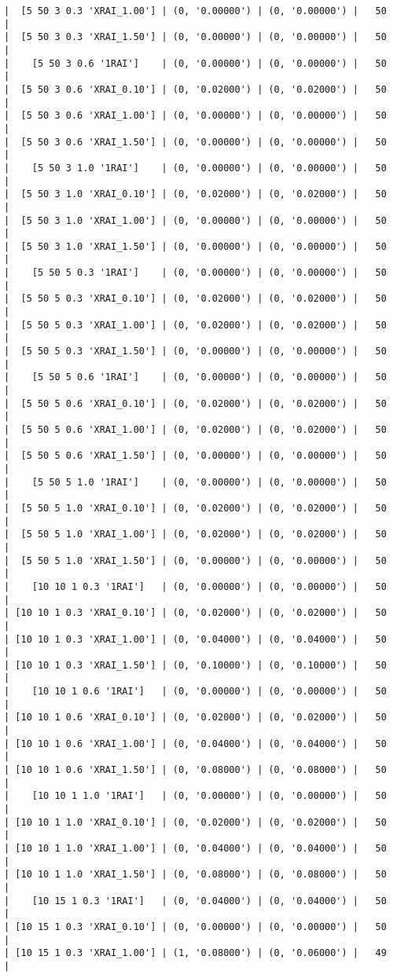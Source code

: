 \documentclass{article}
\begin{document}
\begin{verbatim}
|  [5 50 3 0.3 'XRAI_1.00'] | (0, '0.00000') | (0, '0.00000') |   50  |
|  [5 50 3 0.3 'XRAI_1.50'] | (0, '0.00000') | (0, '0.00000') |   50  |
|    [5 50 3 0.6 '1RAI']    | (0, '0.00000') | (0, '0.00000') |   50  |
|  [5 50 3 0.6 'XRAI_0.10'] | (0, '0.02000') | (0, '0.02000') |   50  |
|  [5 50 3 0.6 'XRAI_1.00'] | (0, '0.00000') | (0, '0.00000') |   50  |
|  [5 50 3 0.6 'XRAI_1.50'] | (0, '0.00000') | (0, '0.00000') |   50  |
|    [5 50 3 1.0 '1RAI']    | (0, '0.00000') | (0, '0.00000') |   50  |
|  [5 50 3 1.0 'XRAI_0.10'] | (0, '0.02000') | (0, '0.02000') |   50  |
|  [5 50 3 1.0 'XRAI_1.00'] | (0, '0.00000') | (0, '0.00000') |   50  |
|  [5 50 3 1.0 'XRAI_1.50'] | (0, '0.00000') | (0, '0.00000') |   50  |
|    [5 50 5 0.3 '1RAI']    | (0, '0.00000') | (0, '0.00000') |   50  |
|  [5 50 5 0.3 'XRAI_0.10'] | (0, '0.02000') | (0, '0.02000') |   50  |
|  [5 50 5 0.3 'XRAI_1.00'] | (0, '0.02000') | (0, '0.02000') |   50  |
|  [5 50 5 0.3 'XRAI_1.50'] | (0, '0.00000') | (0, '0.00000') |   50  |
|    [5 50 5 0.6 '1RAI']    | (0, '0.00000') | (0, '0.00000') |   50  |
|  [5 50 5 0.6 'XRAI_0.10'] | (0, '0.02000') | (0, '0.02000') |   50  |
|  [5 50 5 0.6 'XRAI_1.00'] | (0, '0.02000') | (0, '0.02000') |   50  |
|  [5 50 5 0.6 'XRAI_1.50'] | (0, '0.00000') | (0, '0.00000') |   50  |
|    [5 50 5 1.0 '1RAI']    | (0, '0.00000') | (0, '0.00000') |   50  |
|  [5 50 5 1.0 'XRAI_0.10'] | (0, '0.02000') | (0, '0.02000') |   50  |
|  [5 50 5 1.0 'XRAI_1.00'] | (0, '0.02000') | (0, '0.02000') |   50  |
|  [5 50 5 1.0 'XRAI_1.50'] | (0, '0.00000') | (0, '0.00000') |   50  |
|    [10 10 1 0.3 '1RAI']   | (0, '0.00000') | (0, '0.00000') |   50  |
| [10 10 1 0.3 'XRAI_0.10'] | (0, '0.02000') | (0, '0.02000') |   50  |
| [10 10 1 0.3 'XRAI_1.00'] | (0, '0.04000') | (0, '0.04000') |   50  |
| [10 10 1 0.3 'XRAI_1.50'] | (0, '0.10000') | (0, '0.10000') |   50  |
|    [10 10 1 0.6 '1RAI']   | (0, '0.00000') | (0, '0.00000') |   50  |
| [10 10 1 0.6 'XRAI_0.10'] | (0, '0.02000') | (0, '0.02000') |   50  |
| [10 10 1 0.6 'XRAI_1.00'] | (0, '0.04000') | (0, '0.04000') |   50  |
| [10 10 1 0.6 'XRAI_1.50'] | (0, '0.08000') | (0, '0.08000') |   50  |
|    [10 10 1 1.0 '1RAI']   | (0, '0.00000') | (0, '0.00000') |   50  |
| [10 10 1 1.0 'XRAI_0.10'] | (0, '0.02000') | (0, '0.02000') |   50  |
| [10 10 1 1.0 'XRAI_1.00'] | (0, '0.04000') | (0, '0.04000') |   50  |
| [10 10 1 1.0 'XRAI_1.50'] | (0, '0.08000') | (0, '0.08000') |   50  |
|    [10 15 1 0.3 '1RAI']   | (0, '0.04000') | (0, '0.04000') |   50  |
| [10 15 1 0.3 'XRAI_0.10'] | (0, '0.00000') | (0, '0.00000') |   50  |
| [10 15 1 0.3 'XRAI_1.00'] | (1, '0.08000') | (0, '0.06000') |   49  |

\end{verbatim}
\end{document}
